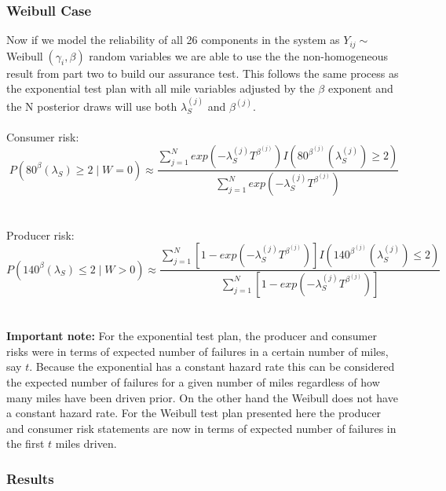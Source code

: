 \documentclass[12pt]{article}
\begin{document}
\subsubsection{Weibull Case}
Now if we model the reliability of all 26 components in the system as
$Y_{ij} \sim$ Weibull$\;(\gamma_i, \beta) $ random variables we are able to use
the the non-homogeneous result from part two to build our assurance test. This
follows the same process as the exponential test plan with all mile variables
adjusted by the $\beta$ exponent and the N posterior draws will use both
$\lambda_S^{(j)}$ and $\beta^{(j)}$.
\\
\\
Consumer risk:
\\
$$
	 P(80^\beta (\lambda_S) \geq 2 \; \vert \; W = 0) \approx \frac{\sum_{j = 1}^{N} exp(-\lambda_S^{(j)} T^{\beta^{(j)}})I(80^{\beta^{(j)}} (\lambda_S^{(j)}) \geq 2)} {\sum_{j = 1}^{N} exp(-\lambda_S^{(j)} T^{\beta^{(j)}})}
$$
\\
\\
Producer risk:
\\
$$
	 P(140^\beta (\lambda_S) \leq 2 \; \vert \; W > 0) \approx  \frac{\sum_{j = 1}^{N} [1 - exp(-\lambda_S^{(j)} T^{\beta^{(j)}})] I(140^{\beta^{(j)}} (\lambda_S^{(j)}) \leq 2)} {\sum_{j = 1}^{N} [1 - exp(-\lambda_S^{(j)} T^{\beta^{(j)}})]}
$$
\\
\\
\textbf{Important note:} For the exponential test plan, the producer and
consumer risks were in terms of expected number of failures in a certain number
of miles, say $t$.  Because the exponential has a constant hazard rate this can
be considered the expected number of failures for a given number of miles
regardless of how many miles have been driven prior.  On the other hand the
Weibull does not have a constant hazard rate.  For the Weibull test plan
presented here the producer and consumer risk statements are now in terms of
expected number of failures in the first $t$ miles driven.



\subsubsection{Results}
\end{document}
